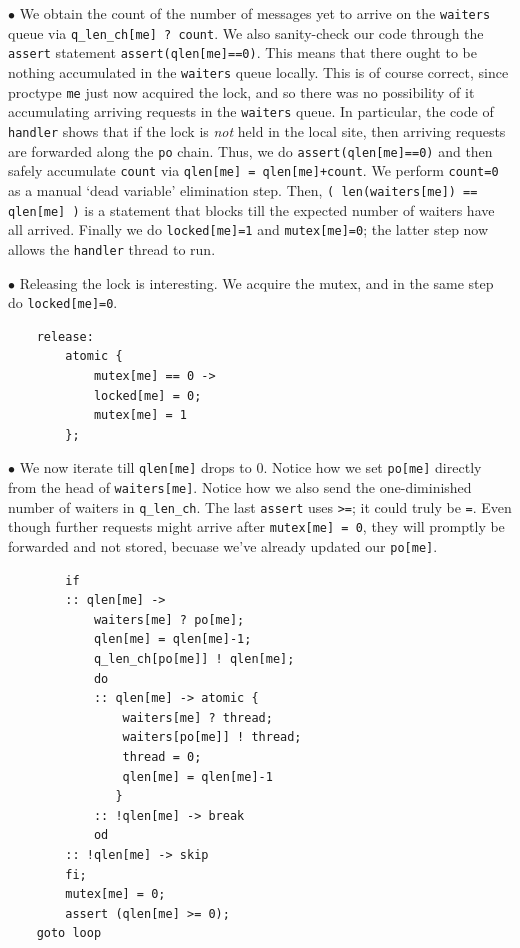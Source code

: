 \documentclass[11pt]{article}
\begin{document}
\noindent$\bullet$
We obtain the count of the number of messages
yet to arrive on the {\tt waiters} queue via
{\tt q\_len\_ch[me] ? count}.
%
We also sanity-check our code through the
{\tt assert} statement {\tt assert(qlen[me]==0)}.
%
This means that there ought to be nothing accumulated in the
{\tt waiters} queue locally.
%
This is of course correct, since proctype {\tt me} just now
acquired the lock, and so there was no possibility of it
accumulating arriving requests in the {\tt waiters} queue.
%
In particular, the code of {\tt handler} shows that if the lock
is {\em not} held in the local site, then arriving requests
are forwarded along the {\tt po} chain.
%
Thus, we do {\tt assert(qlen[me]==0)} and then
safely accumulate {\tt count} via {\tt qlen[me] = qlen[me]+count}.
%
We perform {\tt count=0} as a manual `dead variable' elimination step.
%
Then, {\tt ( len(waiters[me]) == qlen[me] )} is a statement that
blocks till the expected number of waiters have all arrived.
%
Finally we do {\tt locked[me]=1} and {\tt mutex[me]=0}; the latter
step now allows the {\tt handler} thread to run.

\noindent$\bullet$
Releasing the lock is interesting. We acquire the mutex, and in
the same step do {\tt locked[me]=0}.
\begin{small}
\begin{verbatim}
    release:
        atomic {
            mutex[me] == 0 ->
            locked[me] = 0;
            mutex[me] = 1
        };
\end{verbatim}
\end{small}

\noindent$\bullet$
We now iterate till {\tt qlen[me]} drops to 0.
Notice how we set {\tt po[me]} directly from the
head of {\tt waiters[me]}. Notice how we also send
the one-diminished number of waiters in {\tt q\_len\_ch}.
The last {\tt assert} uses \verb|>=|; it could truly be
\verb|=|.
%
Even though further requests might arrive after
{\tt mutex[me] = 0}, they will promptly be forwarded
and not stored, becuase we've already updated our {\tt po[me]}.
%
\begin{small}
\begin{verbatim}        
        if
        :: qlen[me] ->
            waiters[me] ? po[me];
            qlen[me] = qlen[me]-1;
            q_len_ch[po[me]] ! qlen[me];
            do
            :: qlen[me] -> atomic {
                waiters[me] ? thread;
                waiters[po[me]] ! thread;
                thread = 0;
                qlen[me] = qlen[me]-1
               }
            :: !qlen[me] -> break
            od
        :: !qlen[me] -> skip
        fi;
        mutex[me] = 0;
        assert (qlen[me] >= 0);
    goto loop
\end{verbatim}
\end{small}
\end{document}
